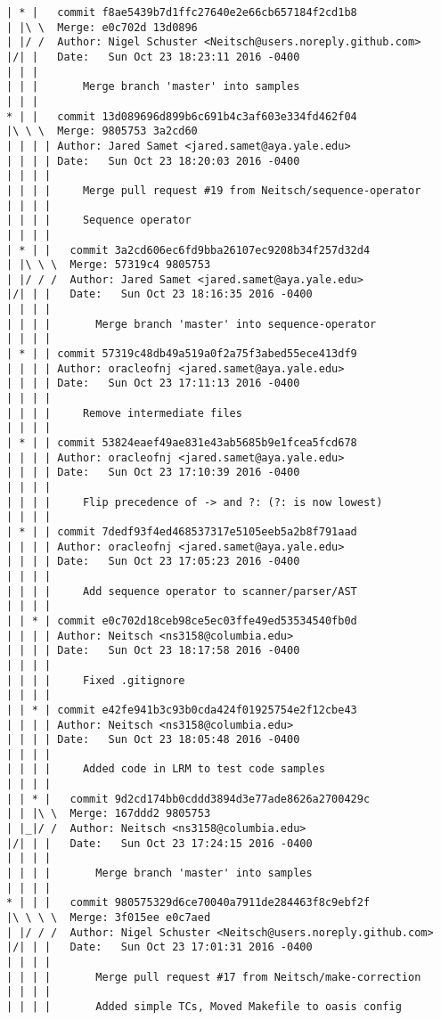 \begin{lstlisting}
| * |   commit f8ae5439b7d1ffc27640e2e66cb657184f2cd1b8
| |\ \  Merge: e0c702d 13d0896
| |/ /  Author: Nigel Schuster <Neitsch@users.noreply.github.com>
|/| |   Date:   Sun Oct 23 18:23:11 2016 -0400
| | |   
| | |       Merge branch 'master' into samples
| | |      
* | |   commit 13d089696d899b6c691b4c3af603e334fd462f04
|\ \ \  Merge: 9805753 3a2cd60
| | | | Author: Jared Samet <jared.samet@aya.yale.edu>
| | | | Date:   Sun Oct 23 18:20:03 2016 -0400
| | | | 
| | | |     Merge pull request #19 from Neitsch/sequence-operator
| | | |     
| | | |     Sequence operator
| | | |       
| * | |   commit 3a2cd606ec6fd9bba26107ec9208b34f257d32d4
| |\ \ \  Merge: 57319c4 9805753
| |/ / /  Author: Jared Samet <jared.samet@aya.yale.edu>
|/| | |   Date:   Sun Oct 23 18:16:35 2016 -0400
| | | |   
| | | |       Merge branch 'master' into sequence-operator
| | | |     
| * | | commit 57319c48db49a519a0f2a75f3abed55ece413df9
| | | | Author: oracleofnj <jared.samet@aya.yale.edu>
| | | | Date:   Sun Oct 23 17:11:13 2016 -0400
| | | | 
| | | |     Remove intermediate files
| | | |     
| * | | commit 53824eaef49ae831e43ab5685b9e1fcea5fcd678
| | | | Author: oracleofnj <jared.samet@aya.yale.edu>
| | | | Date:   Sun Oct 23 17:10:39 2016 -0400
| | | | 
| | | |     Flip precedence of -> and ?: (?: is now lowest)
| | | |     
| * | | commit 7dedf93f4ed468537317e5105eeb5a2b8f791aad
| | | | Author: oracleofnj <jared.samet@aya.yale.edu>
| | | | Date:   Sun Oct 23 17:05:23 2016 -0400
| | | | 
| | | |     Add sequence operator to scanner/parser/AST
| | | |     
| | * | commit e0c702d18ceb98ce5ec03ffe49ed53534540fb0d
| | | | Author: Neitsch <ns3158@columbia.edu>
| | | | Date:   Sun Oct 23 18:17:58 2016 -0400
| | | | 
| | | |     Fixed .gitignore
| | | |     
| | * | commit e42fe941b3c93b0cda424f01925754e2f12cbe43
| | | | Author: Neitsch <ns3158@columbia.edu>
| | | | Date:   Sun Oct 23 18:05:48 2016 -0400
| | | | 
| | | |     Added code in LRM to test code samples
| | | |       
| | * |   commit 9d2cd174bb0cddd3894d3e77ade8626a2700429c
| | |\ \  Merge: 167ddd2 9805753
| |_|/ /  Author: Neitsch <ns3158@columbia.edu>
|/| | |   Date:   Sun Oct 23 17:24:15 2016 -0400
| | | |   
| | | |       Merge branch 'master' into samples
| | | |       
* | | |   commit 980575329d6ce70040a7911de284463f8c9ebf2f
|\ \ \ \  Merge: 3f015ee e0c7aed
| |/ / /  Author: Nigel Schuster <Neitsch@users.noreply.github.com>
|/| | |   Date:   Sun Oct 23 17:01:31 2016 -0400
| | | |   
| | | |       Merge pull request #17 from Neitsch/make-correction
| | | |       
| | | |       Added simple TCs, Moved Makefile to oasis config

\end{lstlisting}
